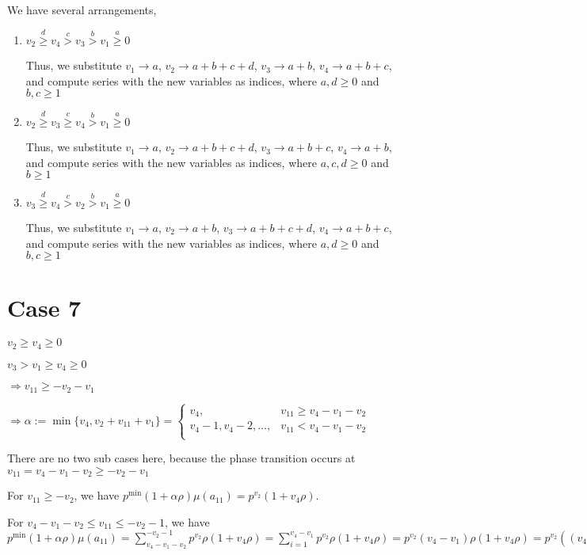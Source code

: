 \documentclass{article}
\begin{document}
We have several arrangements,
\begin{enumerate}
    \item 
$v_2\overset{d}{\geq}v_4\overset{c}{>}v_3\overset{b}{>}{v_1}\overset{a}{\geq}{0}$

Thus, we substitute $v_1\rightarrow{a}$, $v_2\rightarrow{a+b+c+d}$, $v_3\rightarrow{a+b}$, $v_4\rightarrow{a+b+c}$, and compute series with the new variables as indices, where $a,d\geq{0}$ and $b,c\geq{1}$
    \item 
$v_2\overset{d}{\geq}v_3\overset{c}{\geq}v_4\overset{b}{>}{v_1}\overset{a}{\geq}{0}$

Thus, we substitute $v_1\rightarrow{a}$, $v_2\rightarrow{a+b+c+d}$, $v_3\rightarrow{a+b+c}$, $v_4\rightarrow{a+b}$, and compute series with the new variables as indices, where $a,c,d\geq{0}$ and $b\geq{1}$
    \item 
$v_3\overset{d}{\geq}v_4\overset{c}{>}v_2\overset{b}{>}{v_1}\overset{a}{\geq}{0}$

Thus, we substitute $v_1\rightarrow{a}$, $v_2\rightarrow{a+b}$, $v_3\rightarrow{a+b+c+d}$, $v_4\rightarrow{a+b+c}$, and compute series with the new variables as indices, where $a,d\geq{0}$ and $b,c\geq{1}$

\end{enumerate}
\section{Case 7}
$v_2\geq{v_4}\geq{0}$

$v_3>v_1\geq{v_4}\geq{0}$

$\Rightarrow{v_{11}}\geq{-v_2-v_1}$

$\Rightarrow\alpha:=\min\{v_4,v_2+v_{11}+v_1\}=\begin{cases}
       v_4, & v_{11}\geq{v_4-v_1-v_2}\\
       v_4-1,v_4-2,\dots, & v_{11}<{v_4-v_1-v_2}\\
     \end{cases}$

There are no two sub cases here, because the phase transition occurs at $v_{11}={v_4-v_1-v_2}\geq{-v_2-v_1}$

For $v_{11}\geq{-v_2}$, we have $p^{\min}(1+\alpha\rho)\mu(a_{11})=p^{v_2}(1+v_4\rho).$

For $v_4-v_1-v_2\leq{v_{11}}\leq{-v_2-1}$, we have $p^{\min}(1+\alpha\rho)\mu(a_{11})=\sum_{v_4-v_1-v_2}^{-v_2-1}p^{v_2}\rho(1+v_4\rho)=\sum_{i=1}^{v_4-v_1}p^{v_2}\rho(1+v_4\rho)=p^{v_2}(v_4-v_1)\rho(1+v_4\rho)=p^{v_2}((v_4-v_1)\rho+(v_4-v_1)v_4\rho^2).$
\end{document}
